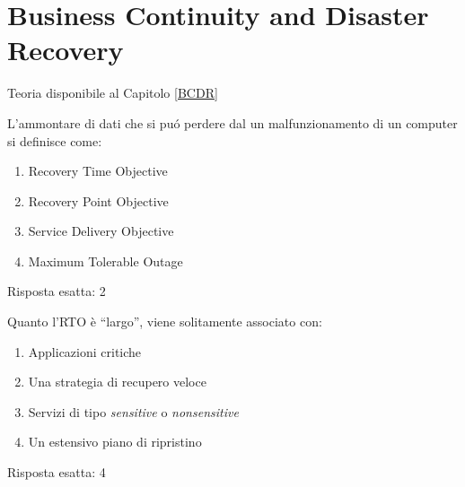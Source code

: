 \chapter{Business Continuity and Disaster Recovery}
\label{EsBCDR1}

Teoria disponibile al Capitolo \ref{BCDR}

\begin{Exercise} [
  title={Definizioni},
  label={bcdr1}
 ]

 \Question L'ammontare di dati che si puó perdere dal un malfunzionamento di 
un computer si definisce come:
\begin{enumerate}
  \item Recovery Time Objective
  \item Recovery Point Objective
  \item Service Delivery Objective
  \item Maximum Tolerable Outage
\end{enumerate}

\end{Exercise}

\begin{Answer} [
   ref={bcdr1},
   number={1}
 ]

  \Question Risposta esatta: 2

\end{Answer}


\begin{Exercise} [
  title={RTO Largo},
  label={bcdr2}
 ]
 
 \Question Quanto l'RTO è ``largo'', viene solitamente associato con:
\begin{enumerate}
  \item Applicazioni critiche
  \item Una strategia di recupero veloce
  \item Servizi di tipo \textit{sensitive} o \textit{nonsensitive}
  \item Un estensivo piano di ripristino
\end{enumerate}

\end{Exercise}

\begin{Answer} [
   ref={bcdr2},
   number={2}
 ]

  \Question Risposta esatta: 4

\end{Answer}

